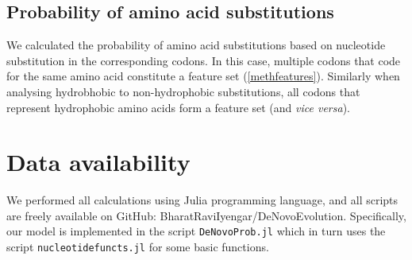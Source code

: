 \documentclass[12pt,a4paper]{article}
\begin{document}
\subsection{Probability of amino acid substitutions}

We calculated the probability of amino acid substitutions based on nucleotide substitution in the corresponding codons. In this case, multiple codons that code for the same amino acid constitute a feature set (\autoref{methfeatures}). Similarly when analysing hydrobhobic to non-hydrophobic substitutions, all codons that represent hydrophobic amino acids form a feature set (and \textit{vice versa}).


\section{Data availability}
We performed all calculations using Julia programming language, and all scripts are freely available on GitHub: BharatRaviIyengar/DeNovoEvolution. Specifically, our model is implemented in the script \texttt{DeNovoProb.jl} which in turn uses the script \texttt{nucleotidefuncts.jl} for some basic functions.



\small

\end{document}
